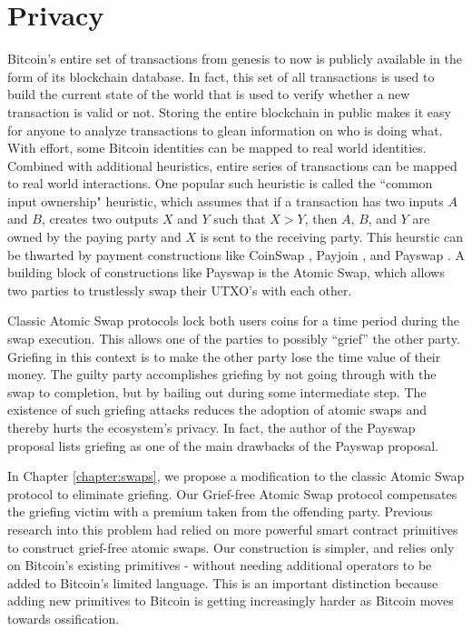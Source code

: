 \section{Privacy}
Bitcoin's entire set of transactions from genesis to now is publicly available in the form of its blockchain database. In fact, this set of all transactions is used to build the current state of the world that is used to verify whether a new transaction is valid or not. Storing the entire blockchain in public makes it easy for anyone to analyze transactions to glean information on who is doing what. With effort, some Bitcoin identities can be mapped to real world identities. Combined with additional heuristics, entire series of transactions can be mapped to real world interactions. One popular such heuristic is called the ``common input ownership" heuristic, which assumes that if a transaction has two inputs $A$ and $B$, creates two outputs $X$ and $Y$ such that $X > Y$, then $A$, $B$, and $Y$ are owned by the paying party and $X$ is sent to the receiving party. This heurstic can be thwarted by payment constructions like CoinSwap \cite{coinswap_maxwell}, Payjoin \cite{payjoin}, and Payswap \cite{payswap}. A building block of constructions like Payswap is the Atomic Swap, which allows two parties to trustlessly swap their UTXO's with each other. 

Classic Atomic Swap protocols lock both users coins for a time period during the swap execution. This allows one of the parties to possibly ``grief'' the other party. Griefing in this context is to make the other party lose the time value of their money. The guilty party accomplishes griefing by not going through with the swap to completion, but by bailing out during some intermediate step. The existence of such griefing attacks reduces the adoption of atomic swaps and thereby hurts the ecosystem's privacy. In fact, the author of the Payswap proposal lists griefing as one of the main drawbacks of the Payswap proposal.

In Chapter \ref{chapter:swaps}, we propose a modification to the classic Atomic Swap protocol to eliminate griefing. Our Grief-free Atomic Swap protocol compensates the griefing victim with a premium taken from the offending party. Previous research into this problem had relied on more powerful smart contract primitives to construct grief-free atomic swaps. Our construction is simpler, and relies only on Bitcoin's existing primitives - without needing additional operators to be added to Bitcoin's limited language. This is an important distinction because adding new primitives to Bitcoin is getting increasingly harder as Bitcoin moves towards ossification. 

